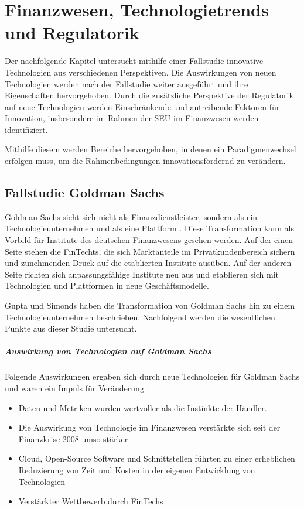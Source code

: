 \chapter{Finanzwesen, Technologietrends und Regulatorik}
\label{ch:background}
Der nachfolgende Kapitel untersucht mithilfe einer Fallstudie innovative Technologien aus verschiedenen Perspektiven. Die Auswirkungen von neuen Technologien werden nach der Fallstudie weiter ausgeführt und ihre Eigenschaften hervorgehoben. Durch die zusätzliche Perspektive der Regulatorik auf neue Technologien werden Einschränkende und antreibende Faktoren für Innovation, insbesondere im Rahmen der \ac{SEU} im Finanzwesen werden identifiziert.

Mithilfe diesem werden Bereiche hervorgehoben, in denen ein Paradigmenwechsel erfolgen muss, um die Rahmenbedingungen innovationsfördernd zu verändern.

\section{Fallstudie Goldman Sachs}
\label{section:Goldman}
Goldman Sachs sieht sich nicht als Finanzdienstleister, sondern als ein Technologieunternehmen und als eine Plattform \cite{Gupta:2017}. Diese Transformation kann als Vorbild für Institute des deutschen Finanzwesens gesehen werden. Auf der einen Seite stehen die FinTechts, die sich Marktanteile im Privatkundenbereich sichern und zunehmenden Druck auf die etablierten Institute ausüben. Auf der anderen Seite richten sich anpassungsfähige Institute neu aus und etablieren sich mit Technologien und Plattformen in neue Geschäftsmodelle. 

Gupta und Simonds \cite{Gupta:2017} haben die Transformation von Goldman Sachs hin zu einem Technologieunternehmen beschrieben. Nachfolgend werden die wesentlichen Punkte aus dieser Studie untersucht.
%
\paragraph{Auswirkung von Technologien auf Goldman Sachs}
Folgende Auswirkungen ergaben sich durch neue Technologien für Goldman Sachs und waren ein Impuls für Veränderung \cite{Gupta:2017}:
\begin{itemize}
    \item Daten und Metriken wurden wertvoller als die Instinkte der Händler.
    \item Die Auswirkung von Technologie im Finanzwesen verstärkte sich seit der Finanzkrise 2008 umso stärker
    \item Cloud, Open-Source Software und Schnittstellen führten zu einer erheblichen Reduzierung von Zeit und Kosten in der eigenen Entwicklung von Technologien
    \item Verstärkter Wettbewerb durch FinTechs
\end{itemize}

